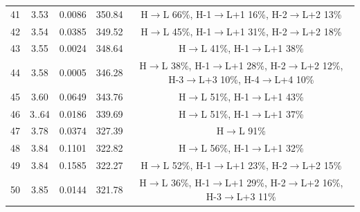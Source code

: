 \begin{table}[H]
{\begin{center}
\begin{tabular}{ccccc}
41 & 3.53 & 0.0086 & 350.84 &  H$\rightarrow$L 66\%, H-1$\rightarrow$L+1 16\%,  H-2$\rightarrow$L+2 13\% \\
42 & 3.54 & 0.0385 & 349.52 &   H$\rightarrow$L 45\%, H-1$\rightarrow$L+1 31\%,  H-2$\rightarrow$L+2 18\% \\ 
43 & 3.55 & 0.0024 & 348.64 &  H$\rightarrow$L 41\%, H-1$\rightarrow$L+1 38\% \\ 
44 & 3.58 & 0.0005 & 346.28 &  H$\rightarrow$L 38\%, H-1$\rightarrow$L+1 28\%,  H-2$\rightarrow$L+2 12\%,  H-3$\rightarrow$L+3 10\%, H-4$\rightarrow$L+4 10\% \\
45 &  3.60 & 0.0649 & 343.76 &  H$\rightarrow$L 51\%, H-1$\rightarrow$L+1 43\% \\ 
46 & 3..64 & 0.0186 & 339.69 &  H$\rightarrow$L 51\%, H-1$\rightarrow$L+1 37\% \\ 
47 & 3.78 & 0.0374 & 327.39 &  H$\rightarrow$L 91\% \\ 
48 & 3.84 & 0.1101 & 322.82 &  H$\rightarrow$L 56\%, H-1$\rightarrow$L+1 32\% \\ 
49 & 3.84 & 0.1585 & 322.27 &  H$\rightarrow$L 52\%, H-1$\rightarrow$L+1 23\%,  H-2$\rightarrow$L+2 15\% \\
50 & 3.85 & 0.0144 & 321.78 &  H$\rightarrow$L 36\%, H-1$\rightarrow$L+1 29\%,  H-2$\rightarrow$L+2 16\%, H-3$\rightarrow$L+3 11\% \\ \hline
\end{tabular} 
\end{center} }
\vspace{-0.2cm}
\end{table} \newpage \noindent

